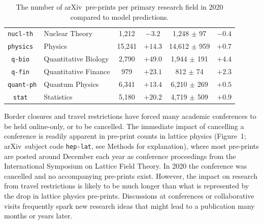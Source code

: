 \documentclass[a4paper,12pt]{article}
\newcommand{\arxiv}{arXiv}
\begin{document}
\begin{table}
\begin{center}
\begin{tabular}{|c|l|c|c|c|c|}
\texttt{nucl-th }    & Nuclear Theory         & 1,212     & $ -3.2$ & 1,248 $\pm$ 97      & $-0.4$ \\
\texttt{physics }    & Physics                & 15,241    & $+14.3$ & 14,612 $\pm$ 959    & $+0.7$ \\
\texttt{q-bio   }    & Quantitative Biology   & 2,790     & $+49.0$ & 1,944 $\pm$ 191     & $+4.4$ \\
\texttt{q-fin   }    & Quantitative Finance   & 979       & $+23.1$ & 812 $\pm$ 74        & $+2.3$ \\
\texttt{quant-ph}    & Quantum Physics        & 6,341     & $+13.4$ & 6,210 $\pm$ 269     & $+0.5$ \\
\texttt{stat    }    & Statistics             & 5,180     & $+20.2$ & 4,719 $\pm$ 509     & $+0.9$ \\
\hline   
    \end{tabular}
       \caption{The number of \arxiv\ pre-prints per primary research field in 2020 compared to model predictions.}
  \end{center}
\end{table}

Border closures and travel restrictions have forced many academic conferences to be held online-only, or to be cancelled. The immediate impact of cancelling a conference is readily apparent in pre-print counts in lattice physics (Figure~1; \arxiv\ subject code \texttt{hep-lat}, see Methods for explanation), where most pre-prints are posted around December each year as conference proceedings from the International Symposium on Lattice Field Theory. In 2020 the conference was cancelled\cite{LatticeConferenceWebsite} and no accompanying pre-prints exist. However, the impact on research from travel restrictions is likely to be much longer than what is represented by the drop in lattice physics pre-prints. Discussions at conferences or collaborative visits frequently spark new research ideas that might lead to a publication many months or years later. 
\end{document}
